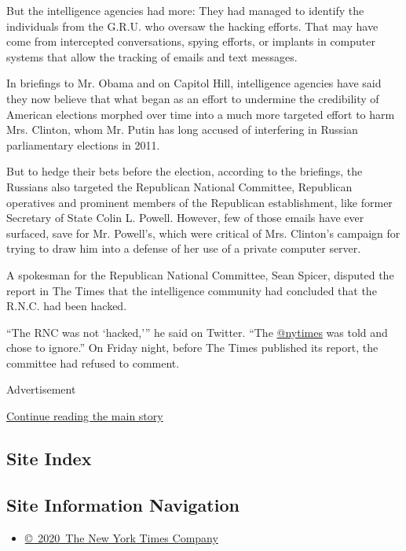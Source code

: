 But the intelligence agencies had more: They had managed to identify the
individuals from the G.R.U. who oversaw the hacking efforts. That may
have come from intercepted conversations, spying efforts, or implants in
computer systems that allow the tracking of emails and text messages.

In briefings to Mr. Obama and on Capitol Hill, intelligence agencies
have said they now believe that what began as an effort to undermine the
credibility of American elections morphed over time into a much more
targeted effort to harm Mrs. Clinton, whom Mr. Putin has long accused of
interfering in Russian parliamentary elections in 2011.

But to hedge their bets before the election, according to the briefings,
the Russians also targeted the Republican National Committee, Republican
operatives and prominent members of the Republican establishment, like
former Secretary of State Colin L. Powell. However, few of those emails
have ever surfaced, save for Mr. Powell's, which were critical of Mrs.
Clinton's campaign for trying to draw him into a defense of her use of a
private computer server.

A spokesman for the Republican National Committee, Sean Spicer, disputed
the report in The Times that the intelligence community had concluded
that the R.N.C. had been hacked.

``The RNC was not `hacked,''' he said on Twitter. ``The
\href{https://twitter.com/nytimes}{@nytimes} was told and chose to
ignore.'' On Friday night, before The Times published its report, the
committee had refused to comment.

Advertisement

\protect\hyperlink{after-bottom}{Continue reading the main story}

\hypertarget{site-index}{%
\subsection{Site Index}\label{site-index}}

\hypertarget{site-information-navigation}{%
\subsection{Site Information
Navigation}\label{site-information-navigation}}

\begin{itemize}
\tightlist
\item
  \href{https://help.nytimes.com/hc/en-us/articles/115014792127-Copyright-notice}{©~2020~The
  New York Times Company}
\end{itemize}

